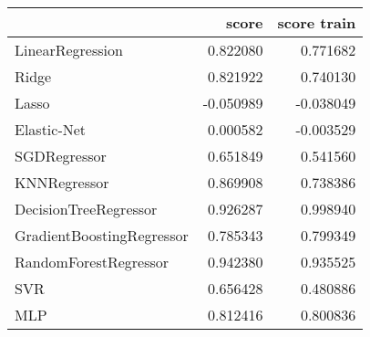 \begin{tabular}{lrr}
\toprule
{} &     score &  score train \\
\midrule
LinearRegression          &  0.822080 &     0.771682 \\
Ridge                     &  0.821922 &     0.740130 \\
Lasso                     & -0.050989 &    -0.038049 \\
Elastic-Net               &  0.000582 &    -0.003529 \\
SGDRegressor              &  0.651849 &     0.541560 \\
KNNRegressor              &  0.869908 &     0.738386 \\
DecisionTreeRegressor     &  0.926287 &     0.998940 \\
GradientBoostingRegressor &  0.785343 &     0.799349 \\
RandomForestRegressor     &  0.942380 &     0.935525 \\
SVR                       &  0.656428 &     0.480886 \\
MLP                       &  0.812416 &     0.800836 \\
\bottomrule
\end{tabular}
